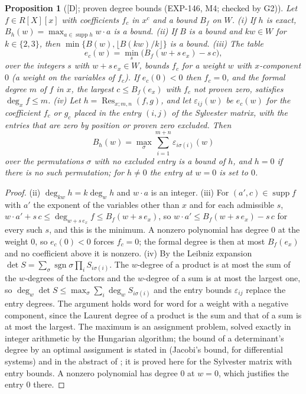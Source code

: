 \documentclass[11pt]{article}
\newtheorem{proposition}[theorem]{Proposition}
\theoremstyle{remark}
\begin{document}
\begin{proposition}[{[D]}; proven degree bounds (EXP-146, M4; checked by G2)]\label{prop:bound}
Let $f\in R[X][x]$ with coefficients $f_c$ in $x^c$ and a bound $B_f$ on $W$. (i) If $h$ is exact, $B_h(w)=\max_{a\in\operatorname{supp}h}w\cdot a$ is a bound. (ii) If $B$ is a bound and $kw\in W$ for $k\in\{2,3\}$, then
$\min\{B(w),\lfloor B(kw)/k\rfloor\}$ is a bound. (iii) The table
\begin{equation}\label{eq:ec}
e_c(w)=\min_{s}\bigl(B_f(w+s\,e_x)-s\,c\bigr),
\end{equation}
over the integers $s$ with $w+s\,e_x\in W$, bounds $f_c$ for a weight $w$ with $x$-component $0$ (a weight on the variables of $f_c$). If $e_c(0)<0$ then $f_c=0$, and the formal degree $m$ of $f$ in $x$, the largest $c\le B_f(e_x)$ with $f_c$ not proven zero, satisfies $\deg_xf\le m$. (iv) Let $h=\operatorname{Res}_{x;m,n}(f,g)$, and let $\varepsilon_{ij}(w)$ be $e_c(w)$ for the coefficient $f_c$ or $g_c$
placed in the entry $(i,j)$ of the Sylvester matrix, with the entries that are zero by position or proven zero excluded. Then
\begin{equation}\label{eq:assign}
B_h(w)=\max_{\sigma}\sum_{i=1}^{m+n}\varepsilon_{i\sigma(i)}(w)
\end{equation}
over the permutations $\sigma$ with no excluded entry is a bound of $h$, and $h=0$ if there is no such permutation; for $h\ne0$ the entry at $w=0$ is set to $0$.
\end{proposition}
\begin{proof}
(ii) $\deg_{kw}h=k\deg_wh$ and $w\cdot a$ is an integer. (iii) For $(a',c)\in\operatorname{supp}f$ with $a'$ the exponent of the variables other than $x$ and for each admissible $s$, $w\cdot a'+s\,c\le\deg_{w+s\,e_x}f\le B_f(w+s\,e_x)$, so
$w\cdot a'\le B_f(w+s\,e_x)-s\,c$ for every such $s$, and this is the minimum. A nonzero polynomial has degree $0$ at the weight $0$, so $e_c(0)<0$ forces $f_c=0$; the formal degree is then at most $B_f(e_x)$ and no coefficient above it is nonzero. (iv) By the Leibniz expansion $\det S=\sum_\sigma\operatorname{sgn}\sigma\prod_i S_{i\sigma(i)}$. The $w$-degree of a product is at most the sum of the $w$-degrees of the factors and the $w$-degree of a sum is at most the largest
one, so $\deg_w\det S\le\max_\sigma\sum_i\deg_wS_{i\sigma(i)}$ and the entry bounds $\varepsilon_{ij}$ replace the entry degrees. The argument holds word for word for a weight with a negative component, since the Laurent degree of a product is the sum and that of a sum is at most the largest. The maximum is an assignment problem, solved exactly in integer
arithmetic by the Hungarian algorithm; the bound of a determinant's degree by an optimal assignment is stated in \cite{Ollivier2010} (Jacobi's bound, for differential systems) and in the abstract of \cite{Murota1995}; it is proved here for the Sylvester matrix with entry bounds. A nonzero polynomial has degree $0$ at $w=0$, which justifies the entry $0$ there.
\end{proof}
\end{document}
